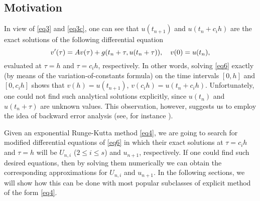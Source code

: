 \subsection{Motivation}
\label{sec2.2}
In view of \eqref{eq3} and \eqref{eq3c}, one can see that $u(t_{n+1})$ and $u(t_n +c_i h)$ are the exact
solutions of the following differential equation
\begin{equation}  \label{eq6}
v'(\tau)=Av(\tau) + g(t_n+\tau,u(t_n+\tau)), \q  v(0)=u(t_n),
\end{equation}
evaluated at $\tau=h$ and $\tau=c_i h$, respectively. In other words, solving \eqref{eq6} exactly (by means of the variation-of-constants formula) on the time intervals $[0, h]$ and $[0, c_i h]$ shows that $v(h)=u(t_{n+1})$,  $v(c_i h)=u(t_n +c_i h)$.
Unfortunately, one could not find such analytical solutions explicitly, since $u(t_n)$ and $u(t_n+\tau)$ are unknown values. This observation, however, suggests us to employ the idea of backward error analysis (see, for instance \cite[Chap. IX]{HLW06}).

 Given an exponential Runge-Kutta method \eqref{eq4}, we are going to search for modified differential equations of \eqref{eq6} in which their exact solutions at $\tau=c_i h$ and $\tau=h$ will be $U_{n,i}$  ($2\leq i\leq s$) and $u_{n+1}$, respectively. If one could find such desired equations, then by solving them numerically we can obtain the corresponding approximations for $U_{n,i}$ and $u_{n+1}$. In the following sections, we will show how this can be done with most popular subclasses of explicit method of the form \eqref{eq4}.